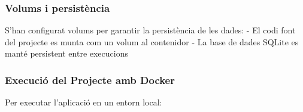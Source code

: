 \hypertarget{volums-i-persistuxe8ncia}{%
\subsubsection{Volums i persistència}\label{volums-i-persistuxe8ncia}}

S'han configurat volums per garantir la persistència de les dades: - El
codi font del projecte es munta com un volum al contenidor - La base de
dades SQLite es manté persistent entre execucions

\hypertarget{execuciuxf3-del-projecte-amb-docker}{%
\subsubsection{Execució del Projecte amb
Docker}\label{execuciuxf3-del-projecte-amb-docker}}

Per executar l'aplicació en un entorn local:

